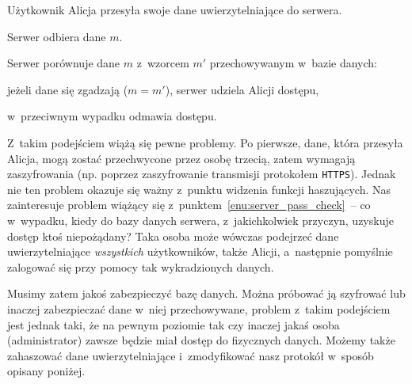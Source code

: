 \begin{myenumerate}

    \item Użytkownik Alicja przesyła swoje dane uwierzytelniające do serwera.

    \item Serwer odbiera dane $m$.

    \item Serwer porównuje dane $m$ z~wzorcem $m'$ przechowywanym w~bazie
    danych: \label{enu:server_pass_check}

    \begin{myenumerate}

        \item jeżeli dane się zgadzają ($m = m'$), serwer udziela Alicji
        dostępu,

        \item w~przeciwnym wypadku odmawia dostępu.

    \end{myenumerate}

\end{myenumerate}

Z~takim podejściem wiążą się pewne problemy. Po pierwsze, dane, która przesyła
Alicja, mogą zostać przechwycone przez osobę trzecią, zatem wymagają
zaszyfrowania (np. poprzez zaszyfrowanie transmisji protokołem \texttt{HTTPS}).
Jednak nie ten problem okazuje się ważny z~punktu widzenia funkcji haszujących.
Nas zainteresuje problem wiążący się z~punktem~\ref{enu:server_pass_check}~--
co w~wypadku, kiedy do bazy danych serwera, z~jakichkolwiek przyczyn, uzyskuje
dostęp ktoś niepożądany? Taka osoba może wówczas podejrzeć dane
uwierzytelniające \emph{wszystkich} użytkowników, także Alicji, a~następnie
pomyślnie zalogować się przy pomocy tak wykradzionych danych.

Musimy zatem jakoś zabezpieczyć bazę danych. Można próbować ją szyfrować lub
inaczej zabezpieczać dane w~niej przechowywane, problem z~takim podejściem jest
jednak taki, że na pewnym poziomie tak czy inaczej jakaś osoba (administrator)
zawsze będzie miał dostęp do fizycznych danych. Możemy także zahaszować dane
uwierzytelniające i~zmodyfikować nasz protokół w~sposób opisany poniżej.

